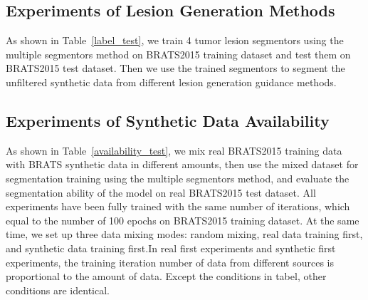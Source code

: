 \documentclass[letterpaper]{article} %
\begin{document}
\subsection{Experiments of Lesion Generation Methods}
\label{label gen methods tests}
As shown in Table~\ref{label_test}, we train 4 tumor lesion segmentors using the multiple segmentors method on BRATS2015 training dataset and test them on BRATS2015 test dataset. Then we use the trained segmentors to segment the unfiltered synthetic data from different lesion generation guidance methods.

\subsection{Experiments of Synthetic Data Availability}
As shown in Table~\ref{availability_test}, we mix real BRATS2015 training data with BRATS synthetic data in different amounts, then use the mixed dataset for segmentation training using the multiple segmentors method, and evaluate the segmentation ability of the model on real BRATS2015 test dataset. All experiments have been fully trained with the same number of iterations, which equal to the number of 100 epochs on BRATS2015 training dataset. At the same time, we set up three data mixing modes: random mixing, real data training first, and synthetic data training first.In real first experiments and synthetic first experiments, the training iteration number of data from different sources is proportional to the amount of data. Except the conditions in tabel, other conditions are identical.
\end{document}
